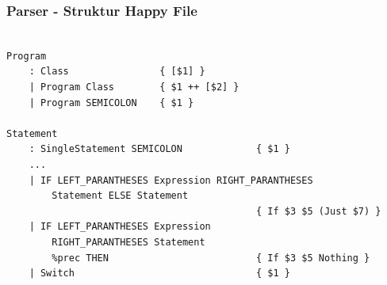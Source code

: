 \begin{frame}[fragile]
	\frametitle{Parser - Struktur Happy File}
	\begin{lstlisting}[basicstyle=\tiny]
		
Program
    : Class                { [$1] }
    | Program Class        { $1 ++ [$2] }
    | Program SEMICOLON    { $1 }

Statement
    : SingleStatement SEMICOLON             { $1 }
	...
    | IF LEFT_PARANTHESES Expression RIGHT_PARANTHESES
        Statement ELSE Statement
                                            { If $3 $5 (Just $7) }
    | IF LEFT_PARANTHESES Expression
        RIGHT_PARANTHESES Statement
        %prec THEN                          { If $3 $5 Nothing }
    | Switch                                { $1 }
	\end{lstlisting}
\end{frame}
